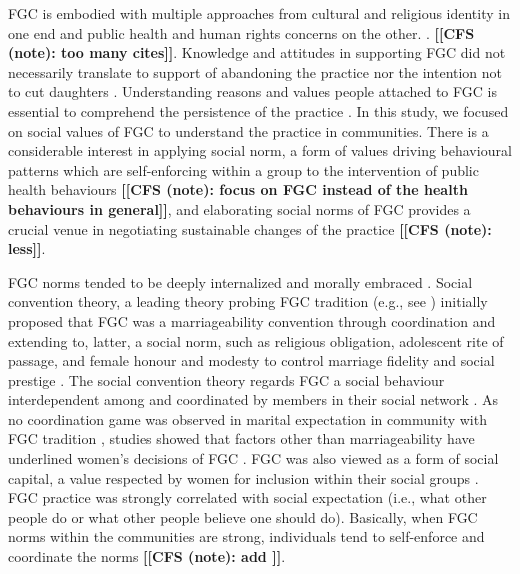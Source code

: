 \documentclass[12pt,]{article}
\newcommand{\comment}[1]{\textbf{[[#1]]}}
\newcommand{\cfonly}[1]{\comment{CFS (note): #1}}
\begin{document}
FGC is embodied with multiple approaches from cultural and religious identity in one end and public health and human rights concerns on the other. \cite{AhmeKare18, BergDeni13a, Boyl02, BoylMcMo02, Grue01, KhosBane17, KimaShell18, McCh15, SchuLien13, WHO12}. \cfonly{too many cites}.  Knowledge and attitudes in supporting FGC did not necessarily translate to support of abandoning the practice nor the intention not to cut daughters \cite{ChegAske04}.  Understanding reasons and values people attached to FGC is essential to comprehend the persistence of the practice \cite{Bicc10, Cami15, CislHeis18, Mack96}.  In this study, we focused on social values of FGC to understand the practice in communities.  There is a considerable interest in applying social norm, a form of values driving behavioural patterns which are self-enforcing within a group \cite{Youn15} to the intervention of public health behaviours \cite{Ajze91, Ajze02, CislHeis18a, MillPrin16, MollRima10, RimaLapi15} \cfonly{focus on FGC instead of the health behaviours in general}, and elaborating social norms of FGC provides a crucial venue in negotiating sustainable changes of the practice \cite{Bicc10, BiccMari15, BoylCorl010, DuncWand11, Drol11, EffeVogt15, Hayf05, HayfTrin11, Grue05, Hodg11,KandNwak09, Mack96, Mack00, MackLeJe08, OdukAfol17, RimaLapi15, Youn02, Youn11, UNIC10, UNIC13} \cfonly{less}. 

FGC norms tended to be deeply internalized and morally embraced \cite{SchuLien13}.  Social convention theory, a leading theory probing FGC tradition (e.g., see \cite{BoylMcMo02, BoylCorl10, FreyJohn07, FrieMahm13, Hayf05, KandMwek09, Mack96, Mack06, ReigGonz14, YirgKass12}) initially proposed that FGC was a marriageability convention through coordination \cite{Mack96} and extending to, latter, a social norm, such as religious obligation, adolescent rite of passage, and female honour and modesty to control marriage fidelity and social prestige \cite{Mack00, MackLeJe08}.   The social convention theory regards FGC a social behaviour interdependent among and coordinated by members in their social network \cite{Mack00, MackLeJe08, ShelWand11}.  As no coordination game was observed in marital expectation in community with FGC tradition \cite{EffeVogt15}, studies showed that factors other than marriageability have underlined women’s  decisions of FGC \cite{AlcaGonz13, BellNova15, EffeVogt15, Hayf05, Mack09, PashPonn16, Rima08, ShelWand11, more?}.  FGC was also viewed as a form of social capital, a value respected by women for inclusion within their social groups \cite{ShelWand11}.    FGC practice was strongly correlated with social expectation (i.e., what other people do or what other people believe one should do)\cite{BiccMari15}.   Basically, when FGC norms within the communities are strong, individuals tend to self-enforce and coordinate the norms \cite{Ajze02, Hayf05, KandNwak09, KandShel19, Mack96, Mack06, MackLeJe08, ThomMadd92} \cfonly{add \cite{Bicc15}}.
\end{document}
